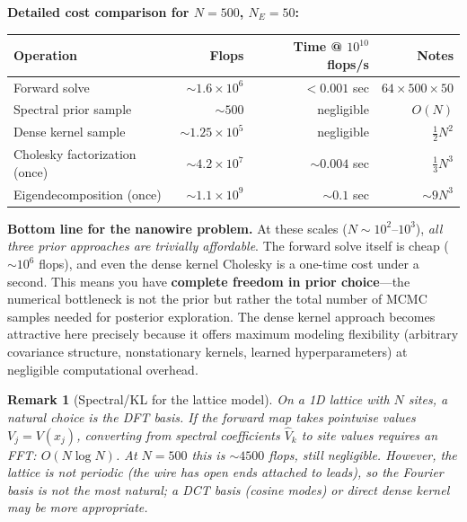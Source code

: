 \documentclass[11pt]{article}
\newtheorem{remark}{Remark}
\begin{document}
\medskip\noindent\textbf{Detailed cost comparison for $N = 500$, $N_E = 50$:}

\begin{center}
\renewcommand{\arraystretch}{1.3}
\begin{tabular}{@{}lrrr@{}}
\toprule
\textbf{Operation} & \textbf{Flops} & \textbf{Time @ $10^{10}$ flops/s} & \textbf{Notes} \\
\midrule
Forward solve & $\sim 1.6 \times 10^6$ & $< 0.001$ sec & $64 \times 500 \times 50$ \\
Spectral prior sample & $\sim 500$ & negligible & $O(N)$ \\
Dense kernel sample & $\sim 1.25 \times 10^5$ & negligible & $\frac{1}{2}N^2$ \\
Cholesky factorization (once) & $\sim 4.2 \times 10^7$ & $\sim 0.004$ sec & $\frac{1}{3}N^3$ \\
Eigendecomposition (once) & $\sim 1.1 \times 10^9$ & $\sim 0.1$ sec & $\sim 9N^3$ \\
\bottomrule
\end{tabular}
\end{center}

\medskip\noindent\textbf{Bottom line for the nanowire problem.}  At these scales ($N \sim 10^2$--$10^3$), \emph{all three prior approaches are trivially affordable}.  The forward solve itself is cheap ($\sim 10^6$ flops), and even the dense kernel Cholesky is a one-time cost under a second.  This means you have \textbf{complete freedom in prior choice}---the numerical bottleneck is not the prior but rather the total number of MCMC samples needed for posterior exploration.  The dense kernel approach becomes attractive here precisely because it offers maximum modeling flexibility (arbitrary covariance structure, nonstationary kernels, learned hyperparameters) at negligible computational overhead.

\begin{remark}[Spectral/KL for the lattice model]
On a 1D lattice with $N$ sites, a natural choice is the DFT basis.  If the forward map takes pointwise values $V_j = V(x_j)$, converting from spectral coefficients $\hat{V}_k$ to site values requires an FFT: $O(N \log N)$.  At $N = 500$ this is $\sim 4500$ flops, still negligible.  However, the lattice is not periodic (the wire has open ends attached to leads), so the Fourier basis is not the most natural; a DCT basis (cosine modes) or direct dense kernel may be more appropriate.
\end{remark}
\end{document}
